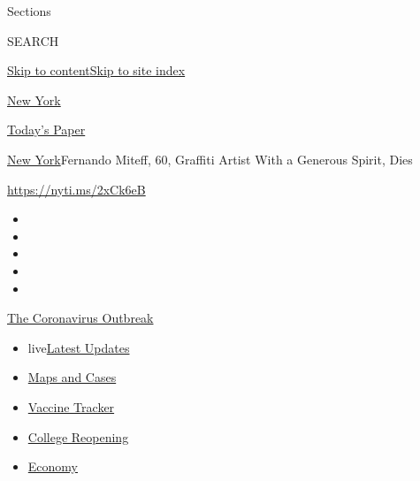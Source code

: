 Sections

SEARCH

\protect\hyperlink{site-content}{Skip to
content}\protect\hyperlink{site-index}{Skip to site index}

\href{https://www.nytimes3xbfgragh.onion/section/nyregion}{New York}

\href{https://myaccount.nytimes3xbfgragh.onion/auth/login?response_type=cookie\&client_id=vi}{}

\href{https://www.nytimes3xbfgragh.onion/section/todayspaper}{Today's
Paper}

\href{/section/nyregion}{New York}\textbar{}Fernando Miteff, 60,
Graffiti Artist With a Generous Spirit, Dies

\url{https://nyti.ms/2xCk6eB}

\begin{itemize}
\item
\item
\item
\item
\item
\end{itemize}

\href{https://www.nytimes3xbfgragh.onion/news-event/coronavirus?action=click\&pgtype=Article\&state=default\&region=TOP_BANNER\&context=storylines_menu}{The
Coronavirus Outbreak}

\begin{itemize}
\tightlist
\item
  live\href{https://www.nytimes3xbfgragh.onion/2020/08/04/world/coronavirus-covid-19.html?action=click\&pgtype=Article\&state=default\&region=TOP_BANNER\&context=storylines_menu}{Latest
  Updates}
\item
  \href{https://www.nytimes3xbfgragh.onion/interactive/2020/us/coronavirus-us-cases.html?action=click\&pgtype=Article\&state=default\&region=TOP_BANNER\&context=storylines_menu}{Maps
  and Cases}
\item
  \href{https://www.nytimes3xbfgragh.onion/interactive/2020/science/coronavirus-vaccine-tracker.html?action=click\&pgtype=Article\&state=default\&region=TOP_BANNER\&context=storylines_menu}{Vaccine
  Tracker}
\item
  \href{https://www.nytimes3xbfgragh.onion/2020/08/02/us/covid-college-reopening.html?action=click\&pgtype=Article\&state=default\&region=TOP_BANNER\&context=storylines_menu}{College
  Reopening}
\item
  \href{https://www.nytimes3xbfgragh.onion/live/2020/08/03/business/stock-market-today-coronavirus?action=click\&pgtype=Article\&state=default\&region=TOP_BANNER\&context=storylines_menu}{Economy}
\end{itemize}

